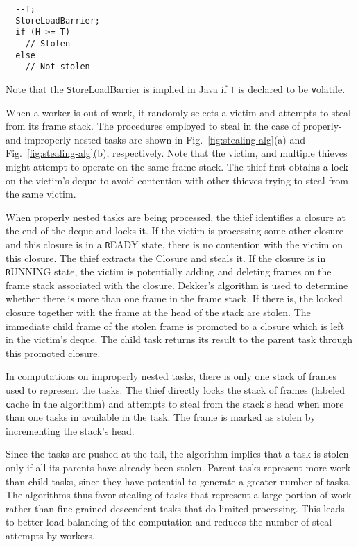 \begin{verbatim}
  --T; 
  StoreLoadBarrier;
  if (H >= T) 
    // Stolen 
  else 
    // Not stolen
\end{verbatim}

Note that the {\texttt StoreLoadBarrier} is implied in Java if
{\texttt T} is declared to be {\texttt volatile}.

When a worker is out of work, it randomly selects a victim and
attempts to steal from its frame stack. The procedures employed to
steal in the case of properly- and improperly-nested tasks are shown
in Fig.~\ref{fig:stealing-alg}(a) and Fig.~\ref{fig:stealing-alg}(b),
respectively. Note that the victim, and multiple thieves might attempt
to operate on the same frame stack. The thief first obtains a lock on
the victim's deque to avoid contention with other thieves trying to
steal from the same victim.

When properly nested tasks are being processed, the thief identifies a
closure at the end of the deque and locks it. If the victim is
processing some other closure and this closure is in a {\texttt READY}
state, there is no contention with the victim on this closure. The
thief extracts the Closure and steals it. If the closure is in
{\texttt RUNNING} state, the victim is potentially adding and deleting
frames on the frame stack associated with the closure. Dekker's
algorithm is used to determine whether there is more than one frame in
the frame stack. If there is, the locked closure together with the
frame at the head of the stack are stolen. The immediate child frame
of the stolen frame is promoted to a closure which is left in the
victim's deque. The child task returns its result to the parent task
through this promoted closure.

In computations on improperly nested tasks, there is only one stack of
frames used to represent the tasks. The thief directly locks the stack
of frames (labeled {\texttt cache} in the algorithm) and attempts to
steal from the stack's head when more than one tasks in available in
the task. The frame is marked as stolen by incrementing the stack's
head. 

Since the tasks are pushed at the tail, the algorithm implies that a
task is stolen only if all its parents have already been
stolen. Parent tasks represent more work than child tasks, since they
have potential to generate a greater number of tasks. The algorithms
thus favor stealing of tasks that represent a large portion of work
rather than fine-grained descendent tasks that do limited
processing. This leads to better load balancing of the computation and
reduces the number of steal attempts by workers.



